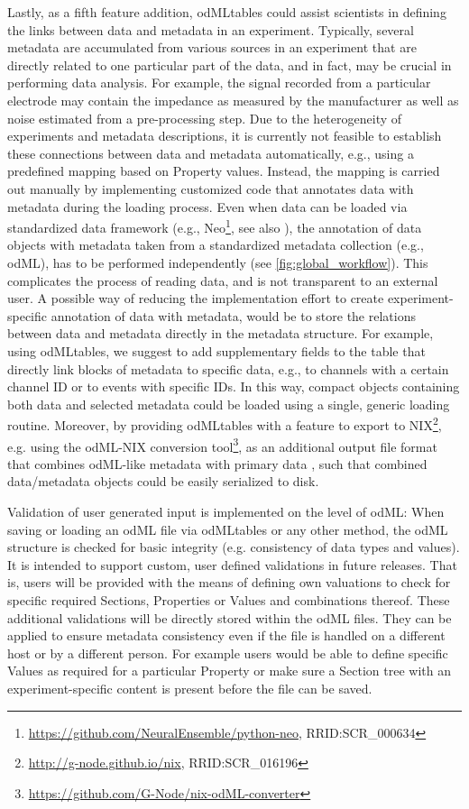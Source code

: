 {Lastly, as a fifth feature addition, odMLtables could assist scientists in defining the links between data and metadata in an experiment. Typically, several metadata are accumulated from various sources in an experiment that are directly related to one particular part of the data, and in fact, may be crucial in performing data analysis. For example, the signal recorded from a particular electrode may contain the impedance as measured by the manufacturer as well as noise estimated from a pre-processing step. Due to the heterogeneity of experiments and metadata descriptions, it is currently not feasible to establish these connections between data and metadata automatically, e.g., using a predefined mapping based on Property values. Instead, the mapping is carried out manually by implementing customized code that annotates data with metadata during the loading process. Even when data can be loaded via standardized data framework (e.g., Neo\footnote{\url{https://github.com/NeuralEnsemble/python-neo}, RRID:SCR\_000634}, see also \citealp{Garcia_2014}), the annotation of data objects with metadata taken from a standardized metadata collection (e.g., odML), has to be performed independently (see \cref{fig:global_workflow}). This complicates the process of reading data, and is not transparent to an external user. A possible way of reducing the implementation effort to create experiment-specific annotation of data with metadata, would be to store the relations between data and metadata directly in the metadata structure. For example, using odMLtables, we suggest to add supplementary fields to the table that directly link blocks of metadata to specific data, e.g., to channels with a certain channel ID or to events with specific IDs. In this way, compact objects containing both data and selected metadata could be loaded using a single, generic loading routine. Moreover, by providing odMLtables with a feature to export to NIX\footnote{\url{http://g-node.github.io/nix}, RRID:SCR\_016196}, e.g. using the odML-NIX conversion tool\footnote{\url{https://github.com/G-Node/nix-odML-converter}}, as an additional output file format that combines odML-like metadata with primary data \citep{Stoewer_2014}, such that combined data/metadata objects could be easily serialized to disk.

Validation of user generated input is implemented on the level of odML: When saving or loading an odML file via odMLtables or any other method, the odML structure is checked for basic integrity (e.g. consistency of data types and values). It is intended to support custom, user defined validations in future releases. That is, users will be provided with the means of defining own valuations to check for specific required Sections, Properties or Values and combinations thereof. These additional validations will be directly stored within the odML files. They can be applied to ensure metadata consistency even if the file is handled on a different host or by a different person.
For example users would be able to define specific Values as required for a particular Property or make sure a Section tree with an experiment-specific content is present before the file can be saved.

}
